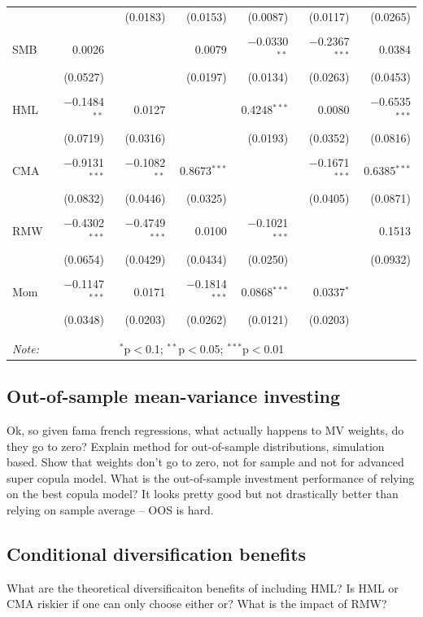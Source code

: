 \begin{table}[!htbp]
\begin{tabularx}{\textwidth}{@{\extracolsep{0pt}}X rrrrrr}
  &  & (0.0183) & (0.0153) & (0.0087) & (0.0117) & (0.0265) \\ 
  & & & & & & \\ 
 SMB & 0.0026 &  & 0.0079 & $-$0.0330$^{**}$ & $-$0.2367$^{***}$ & 0.0384 \\ 
  & (0.0527) &  & (0.0197) & (0.0134) & (0.0263) & (0.0453) \\ 
  & & & & & & \\ 
 HML & $-$0.1484$^{**}$ & 0.0127 &  & 0.4248$^{***}$ & 0.0080 & $-$0.6535$^{***}$ \\ 
  & (0.0719) & (0.0316) &  & (0.0193) & (0.0352) & (0.0816) \\ 
  & & & & & & \\ 
 CMA & $-$0.9131$^{***}$ & $-$0.1082$^{**}$ & 0.8673$^{***}$ &  & $-$0.1671$^{***}$ & 0.6385$^{***}$ \\ 
  & (0.0832) & (0.0446) & (0.0325) &  & (0.0405) & (0.0871) \\ 
  & & & & & & \\ 
 RMW & $-$0.4302$^{***}$ & $-$0.4749$^{***}$ & 0.0100 & $-$0.1021$^{***}$ &  & 0.1513 \\ 
  & (0.0654) & (0.0429) & (0.0434) & (0.0250) &  & (0.0932) \\ 
  & & & & & & \\ 
 Mom & $-$0.1147$^{***}$ & 0.0171 & $-$0.1814$^{***}$ & 0.0868$^{***}$ & 0.0337$^{*}$ &  \\ 
  & (0.0348) & (0.0203) & (0.0262) & (0.0121) & (0.0203) &  \\ 
  & & & & & & \\ 
\bottomrule \\[-1.8ex] 
\textit{Note:}  & \multicolumn{5}{c}{$^{*}$p$<$0.1; $^{**}$p$<$0.05; $^{***}$p$<$0.01} \\ 
\end{tabularx} 
\end{table}

\subsection{Out-of-sample mean-variance investing}
\label{subsec:mean_variance}

Ok, so given fama french regressions, what actually happens to MV weights, do they go to zero? Explain method for out-of-sample distributions, simulation based. Show that weights don't go to zero, not for sample and not for advanced super copula model. What is the out-of-sample investment performance of relying on the best copula model? It looks pretty good but not drastically better than relying on sample average -- OOS is hard.

\subsection{Conditional diversification benefits}
\label{subsec:cdb}

What are the theoretical diversificaiton benefits of including HML? Is HML or CMA riskier if one can only choose either or? What is the impact of RMW?